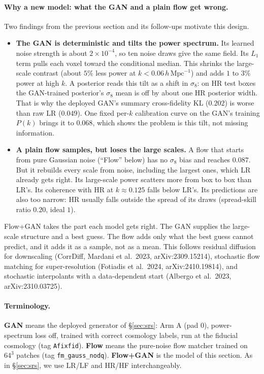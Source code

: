 \paragraph{Why a new model: what the GAN and a plain flow get wrong.} Two
findings from the previous section and its follow-ups motivate this design.
\begin{itemize}
  \item \textbf{The GAN is deterministic and tilts the power spectrum.} Its
  learned noise strength is about $2\times10^{-4}$, so ten noise draws give the
  same field. Its $L_1$ term pulls each voxel toward the conditional median.
  This shrinks the large-scale contrast (about $5\%$ less power at $k<0.06\,h\,\mathrm{Mpc}^{-1}$)
  and adds $1$ to $3\%$ power at high $k$. A posterior reads this tilt as a
  shift in $\sigma_8$: on HR test boxes the GAN-trained posterior's $\sigma_8$ mean
  is off by about one HR posterior width. That is why the deployed GAN's summary
  cross-fidelity KL ($0.202$) is worse than raw LR ($0.049$). One fixed per-$k$
  calibration curve on the GAN's training $P(k)$ brings it to $0.068$, which
  shows the problem is this tilt, not missing information.
  \item \textbf{A plain flow samples, but loses the large scales.} A flow that
  starts from pure Gaussian noise (``Flow'' below) has no $\sigma_8$ bias and
  reaches $0.087$. But it rebuilds every scale from noise, including the largest
  ones, which LR already gets right. Its large-scale power scatters more from box
  to box than LR's. Its coherence with HR at $k\approx0.125$ falls below LR's.
  Its predictions are also too narrow: HR usually falls outside the spread of its
  draws (spread-skill ratio $0.20$, ideal $1$).
\end{itemize}
Flow+GAN takes the part each model gets right. The GAN supplies the large-scale
structure and a best guess. The flow adds only what the best guess cannot
predict, and it adds it as a sample, not as a mean. This follows residual
diffusion for downscaling (CorrDiff, Mardani et al.\ 2023, arXiv:2309.15214),
stochastic flow matching for super-resolution (Fotiadis et al.\ 2024,
arXiv:2410.19814), and stochastic interpolants with a data-dependent start
(Albergo et al.\ 2023, arXiv:2310.03725).

\paragraph{Terminology.} \textbf{GAN} means the deployed generator of
\S\ref{sec:srs}: Arm A (pad $0$), power-spectrum loss off, trained with correct
cosmology labels, run at the fiducial cosmology (tag \texttt{Afixfid}).
\textbf{Flow} means the pure-noise flow matcher trained on $64^3$ patches (tag
\texttt{fm\_gauss\_nodq}). \textbf{Flow+GAN} is the model of this section. As in
\S\ref{sec:srs}, we use LR/LF and HR/HF interchangeably.

